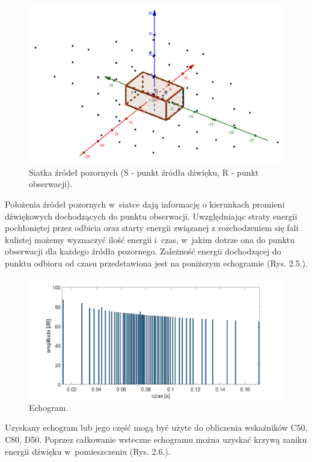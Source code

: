 \begin{figure}[H]
        \centering
                \centering
                \includegraphics[width=12cm]{rys4}
	\caption{Siatka źródeł pozornych (S - punkt źródła dźwięku, R - punkt obserwacji).}
\end{figure}

Położenia  źródeł pozornych w~siatce dają informację o kierunkach promieni dźwiękowych dochodzących do punktu obserwacji. Uwzględniając straty energii pochłoniętej przez odbicia oraz starty energii związanej z rozchodzeniem się fali kulistej możemy wyznaczyć  ilość energii i~czas, w~jakim dotrze ona do punktu obserwacji dla każdego źródła pozornego. Zależność energii dochodzącej do punktu odbioru od czasu przedstawiona jest na poniższym echogramie (Rys. 2.5.).

\begin{figure}[H]
        \centering
                \centering
                \includegraphics[width=16cm]{rys5}
	\caption{Echogram.}
\end{figure}

Uzyskany echogram lub jego część mogą być użyte do obliczenia wskaźników C50, C80, D50. Poprzez całkowanie wsteczne echogramu można uzyskać krzywą zaniku energii dźwięku w~pomieszczeniu (Rys. 2.6.).

